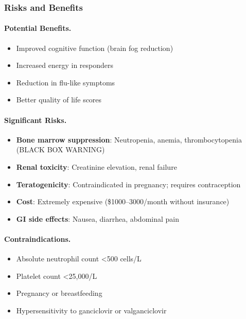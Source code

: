 \subsubsection{Risks and Benefits}

\paragraph{Potential Benefits.}
\begin{itemize}
    \item Improved cognitive function (brain fog reduction)
    \item Increased energy in responders
    \item Reduction in flu-like symptoms
    \item Better quality of life scores
\end{itemize}

\paragraph{Significant Risks.}
\begin{itemize}
    \item \textbf{Bone marrow suppression}: Neutropenia, anemia, thrombocytopenia (BLACK BOX WARNING)
    \item \textbf{Renal toxicity}: Creatinine elevation, renal failure
    \item \textbf{Teratogenicity}: Contraindicated in pregnancy; requires contraception
    \item \textbf{Cost}: Extremely expensive (\$1000--3000/month without insurance)
    \item \textbf{GI side effects}: Nausea, diarrhea, abdominal pain
\end{itemize}

\paragraph{Contraindications.}
\begin{itemize}
    \item Absolute neutrophil count <500 cells/\textmu L
    \item Platelet count <25,000/\textmu L
    \item Pregnancy or breastfeeding
    \item Hypersensitivity to ganciclovir or valganciclovir
\end{itemize}

